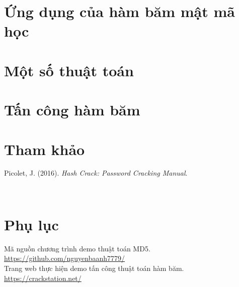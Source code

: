 \documentclass[man]{apa7}
\begin{document}
\section{Ứng dụng của hàm băm mật mã học}

\section{Một số thuật toán}

\section{Tấn công hàm băm}


\newpage
\section{Tham khảo}
\noindent Picolet, J. (2016). \textit{Hash Crack: Password Cracking Manual}.

\, \\[0.5cm]

\section{Phụ lục}
\noindent Mã nguồn chương trình demo thuật toán MD5.\\
\href{https://github.com/nguyenbaanh7779/code_mat_ma?fbclid=IwAR20RJeoBfcSAayob8vxjEPxBI3zdnPd7JFRE7L9xxqbpfqzSylKG9a0eHM}{https://github.com/nguyenbaanh7779/}\\
\noindent Trang web thực hiện demo tấn công thuật toán hàm băm.\\
\href{https://crackstation.net/?fbclid=IwAR2_eiuPHRtrLvUnXNkEY9dLh9bE5JLRALgDlPUUraKCGqXX9CsqdOjS3ao}{https://crackstation.net/}
\end{document}

